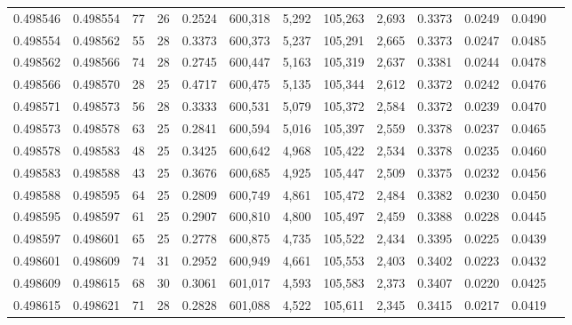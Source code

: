 \begin{tabular}{rrrrrrrrrrrrr}
0.498546 & 0.498554 &  77 &  26 &                                     0.2524 & 600,318 &   5,292 & 105,263 &   2,693 & 0.3373 & 0.0249 & 0.0490 \\
0.498554 & 0.498562 &  55 &  28 &                                     0.3373 & 600,373 &   5,237 & 105,291 &   2,665 & 0.3373 & 0.0247 & 0.0485 \\
0.498562 & 0.498566 &  74 &  28 &                                     0.2745 & 600,447 &   5,163 & 105,319 &   2,637 & 0.3381 & 0.0244 & 0.0478 \\
0.498566 & 0.498570 &  28 &  25 &                                     0.4717 & 600,475 &   5,135 & 105,344 &   2,612 & 0.3372 & 0.0242 & 0.0476 \\
0.498571 & 0.498573 &  56 &  28 &                                     0.3333 & 600,531 &   5,079 & 105,372 &   2,584 & 0.3372 & 0.0239 & 0.0470 \\
0.498573 & 0.498578 &  63 &  25 &                                     0.2841 & 600,594 &   5,016 & 105,397 &   2,559 & 0.3378 & 0.0237 & 0.0465 \\
0.498578 & 0.498583 &  48 &  25 &                                     0.3425 & 600,642 &   4,968 & 105,422 &   2,534 & 0.3378 & 0.0235 & 0.0460 \\
0.498583 & 0.498588 &  43 &  25 &                                     0.3676 & 600,685 &   4,925 & 105,447 &   2,509 & 0.3375 & 0.0232 & 0.0456 \\
0.498588 & 0.498595 &  64 &  25 &                                     0.2809 & 600,749 &   4,861 & 105,472 &   2,484 & 0.3382 & 0.0230 & 0.0450 \\
0.498595 & 0.498597 &  61 &  25 &                                     0.2907 & 600,810 &   4,800 & 105,497 &   2,459 & 0.3388 & 0.0228 & 0.0445 \\
0.498597 & 0.498601 &  65 &  25 &                                     0.2778 & 600,875 &   4,735 & 105,522 &   2,434 & 0.3395 & 0.0225 & 0.0439 \\
0.498601 & 0.498609 &  74 &  31 &                                     0.2952 & 600,949 &   4,661 & 105,553 &   2,403 & 0.3402 & 0.0223 & 0.0432 \\
0.498609 & 0.498615 &  68 &  30 &                                     0.3061 & 601,017 &   4,593 & 105,583 &   2,373 & 0.3407 & 0.0220 & 0.0425 \\
0.498615 & 0.498621 &  71 &  28 &                                     0.2828 & 601,088 &   4,522 & 105,611 &   2,345 & 0.3415 & 0.0217 & 0.0419 \\

\end{tabular}
